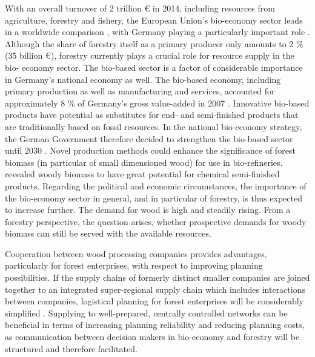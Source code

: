 With an overall turnover of 2 trillion {\euro} in 2014, including resources from agriculture, forestry and fishery, the European Union's bio-economy sector leads in a worldwide comparison \citep[p. 221, 223]{elchichakli_2016}, with Germany playing a particularly important role \citep[p. 200]{hennig_2016}. Although the share of forestry itself as a primary producer only amounts to 2 \% (35 billion {\euro}), forestry currently plays a crucial role for resource supply in the bio- economy sector. The bio-based sector is a factor of considerable importance in Germany's national economy as well. The bio-based economy, including primary production as well as manufacturing and services, accounted for approximately 8 \% of Germany's gross value-added in 2007 \citep[p. 29-30]{efken_2012}. Innovative bio-based products have potential as substitutes for end- and semi-finished products that are traditionally based on fossil resources. In the national bio-economy strategy, the German Government therefore decided to strengthen the bio-based sector until 2030 \citep[p. 15-16]{bmel_2014b}. Novel production methods could enhance the significance of forest biomass (in particular of small dimensioned wood) for use in bio-refineries. \citet[p. 49]{ekman_2013} revealed woody biomass to have great potential for chemical semi-finished products. Regarding the political and economic circumstances, the importance of the bio-economy sector in general, and in particular of forestry, is thus expected to increase further. The demand for wood is high and steadily rising. From a forestry perspective, the question arises, whether prospective demands for woody biomass can still be served with the available resources.

Cooperation between wood processing companies provides advantages, particularly for forest enterprises, with respect to improving planning possibilities. If the supply chains of formerly distinct smaller companies are joined together to an integrated super-regional supply chain which includes interactions between companies, logistical planning for forest enterprises will be considerably simplified \citep[p. 3]{geldermann_2016}. Supplying to well-prepared, centrally controlled networks can be beneficial in terms of increasing planning reliability and reducing planning costs, as communication between decision makers in bio-economy and forestry will be structured and therefore facilitated.

